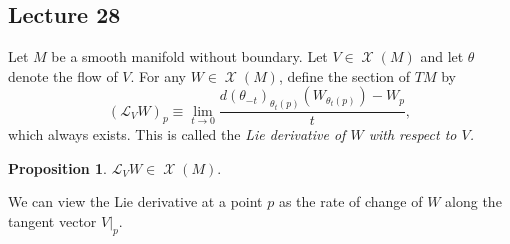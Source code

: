 \documentclass[10pt,letterpaper,cm]{nupset}
\theoremstyle{definition}
\theoremstyle{theorem}
\newtheorem{prop}[definition]{Proposition}
\theoremstyle{remark}
\newcommand{\1}{\mathbf{1}}
\newcommand{\0}{\vec 0}
\DeclareMathOperator{\vf}{\mathscr{X}}
\begin{document}
\subsection{Lecture 28}

Let $M$ be a smooth manifold without boundary. Let $V\in \vf(M)$ and let $\theta$ denote the flow of $V$. For any $W\in \vf(M)$, define the section of $T{M}$ by $$ \left(\mathcal{L}_VW\right)_p  \equiv \lim_{t\to 0}\frac{d(\theta_{-t})_{\theta_t(p)}\left(W_{\theta_{t}(p)}\right)-W_p }{t},$$ which always exists.  This is called the \textit{Lie derivative of $W$ with respect to $V$.} 

\begin{prop}
$\mathcal{L}_VW \in \vf(M)$.
\end{prop}

\smallskip

We can view the Lie derivative at a point $p$ as the  rate of change of $W$ along the tangent vector $V\bigr\rvert_p$.

\smallskip
\end{document}
